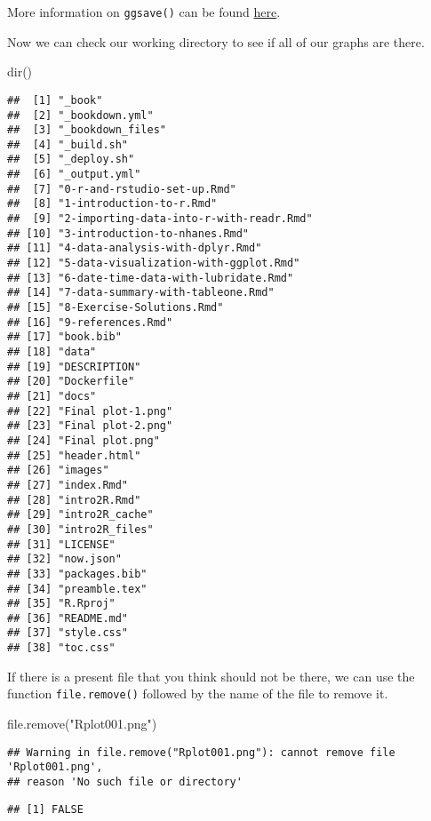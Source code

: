 \documentclass[
]{book}
\newenvironment{Shaded}{\begin{snugshade}}{\end{snugshade}}
\newcommand{\FunctionTok}[1]{\textcolor[rgb]{0.00,0.00,0.00}{#1}}
\newcommand{\NormalTok}[1]{#1}
\newcommand{\StringTok}[1]{\textcolor[rgb]{0.31,0.60,0.02}{#1}}
\begin{document}
More information on \texttt{ggsave()} can be found \href{https://www.rdocumentation.org/packages/ggplot2/versions/3.3.3/topics/ggsave}{here}.

Now we can check our working directory to see if all of our graphs are there.

\begin{Shaded}
\begin{Highlighting}[]
\FunctionTok{dir}\NormalTok{()}
\end{Highlighting}
\end{Shaded}

\begin{verbatim}
##  [1] "_book"
##  [2] "_bookdown.yml"
##  [3] "_bookdown_files"
##  [4] "_build.sh"
##  [5] "_deploy.sh"
##  [6] "_output.yml"
##  [7] "0-r-and-rstudio-set-up.Rmd"
##  [8] "1-introduction-to-r.Rmd"
##  [9] "2-importing-data-into-r-with-readr.Rmd"
## [10] "3-introduction-to-nhanes.Rmd"
## [11] "4-data-analysis-with-dplyr.Rmd"
## [12] "5-data-visualization-with-ggplot.Rmd"
## [13] "6-date-time-data-with-lubridate.Rmd"
## [14] "7-data-summary-with-tableone.Rmd"
## [15] "8-Exercise-Solutions.Rmd"
## [16] "9-references.Rmd"
## [17] "book.bib"
## [18] "data"
## [19] "DESCRIPTION"
## [20] "Dockerfile"
## [21] "docs"
## [22] "Final plot-1.png"
## [23] "Final plot-2.png"
## [24] "Final plot.png"
## [25] "header.html"
## [26] "images"
## [27] "index.Rmd"
## [28] "intro2R.Rmd"
## [29] "intro2R_cache"
## [30] "intro2R_files"
## [31] "LICENSE"
## [32] "now.json"
## [33] "packages.bib"
## [34] "preamble.tex"
## [35] "R.Rproj"
## [36] "README.md"
## [37] "style.css"
## [38] "toc.css"
\end{verbatim}

If there is a present file that you think should not be there, we can use the function \texttt{file.remove()} followed by the name of the file to remove it.

\begin{Shaded}
\begin{Highlighting}[]
\FunctionTok{file.remove}\NormalTok{(}\StringTok{"Rplot001.png"}\NormalTok{)}
\end{Highlighting}
\end{Shaded}

\begin{verbatim}
## Warning in file.remove("Rplot001.png"): cannot remove file 'Rplot001.png',
## reason 'No such file or directory'
\end{verbatim}

\begin{verbatim}
## [1] FALSE
\end{verbatim}
\end{document}
